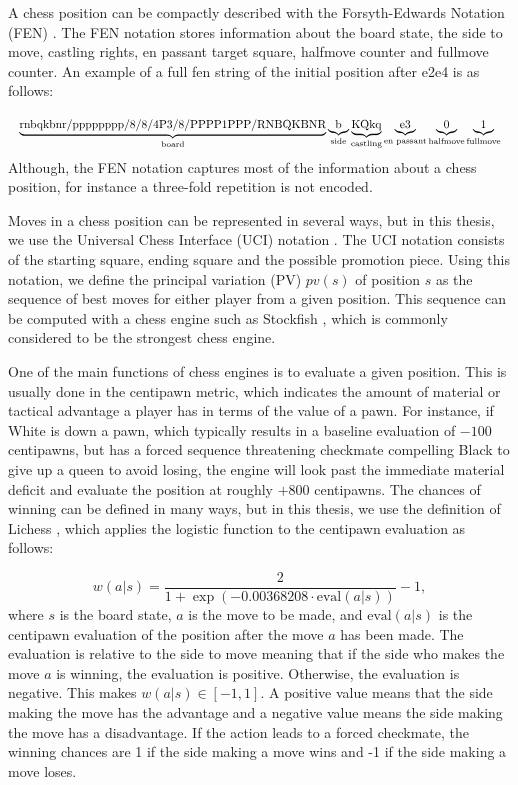 A chess position can be compactly described with the Forsyth-Edwards Notation (FEN) \cite{fennotation}. The FEN notation stores information about the board state, the side to move, castling rights, en passant target square, halfmove counter and fullmove counter. An example of a full fen string of the initial position after e2e4 is as follows:

\begin{equation*}
    \resizebox{\textwidth}{!}{$
            \underbrace{\text{rnbqkbnr/pppppppp/8/8/4P3/8/PPPP1PPP/RNBQKBNR}}_{\text{board}} \underbrace{\text{b}}_{\text{side}} \underbrace{\text{KQkq}}_{\text{castling}} \underbrace{\text{e3}}_{\text{en passant}} \underbrace{0}_{\text{halfmove}} \underbrace{1}_{\text{fullmove}}
        $}
\end{equation*}
Although, the FEN notation captures most of the information about a chess position, for instance a three-fold repetition is not encoded.

Moves in a chess position can be represented in several ways, but in this thesis, we use the Universal Chess Interface (UCI) notation \cite{UCIchessinterface}. The UCI notation consists of the starting square, ending square and the possible promotion piece. Using this notation, we define the principal variation (PV) $pv(s)$ of position $s$ as the sequence of best moves for either player from a given position. This sequence can be computed with a chess engine such as Stockfish \cite{stockfish}, which is commonly considered to be the strongest chess engine.

One of the main functions of chess engines is to evaluate a given position. This is usually done in the centipawn metric, which indicates the amount of material or tactical advantage a player has in terms of the value of a pawn. For instance, if White is down a pawn, which typically results in a baseline evaluation of $-100$ centipawns, but has a forced sequence threatening checkmate compelling Black to give up a queen to avoid losing, the engine will look past the immediate material deficit and evaluate the position at roughly $+800$ centipawns. The chances of winning can be defined in many ways, but in this thesis, we use the definition of Lichess \cite{Lichessaccuracymetric}, which applies the logistic function to the centipawn evaluation as follows:

\begin{equation}
    w(a | s) = \frac{2}{1 + \exp(-0.00368208\cdot\text{eval}(a | s))} - 1,
    \label{eq:prob_win}
\end{equation}
where $s$ is the board state, $a$ is the move to be made, and $\text{eval}(a | s)$ is the centipawn evaluation of the position after the move $a$ has been made. The evaluation is relative to the side to move meaning that if the side who makes the move $a$ is winning, the evaluation is positive. Otherwise, the evaluation is negative. This makes $w(a |s)\in[-1, 1]$. A positive value means that the side making the move has the advantage and a negative value means the side making the move has a disadvantage. If the action leads to a forced checkmate, the winning chances are 1 if the side making a move wins and -1 if the side making a move loses.

